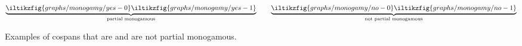 \begin{figure}
    \centering
    \[
        \underbrace{
            \iltikzfig{graphs/monogamy/yes-0}
            \iltikzfig{graphs/monogamy/yes-1}
        }_{\text{partial monogamous}}
        \qquad
        \underbrace{
            \iltikzfig{graphs/monogamy/no-0}
            \iltikzfig{graphs/monogamy/no-1}
        }_{\text{not partial monogamous}}
    \]
    \caption{Examples of cospans that are and are not partial monogamous.}
    \label{fig:partial-monogamous-examples}
\end{figure}